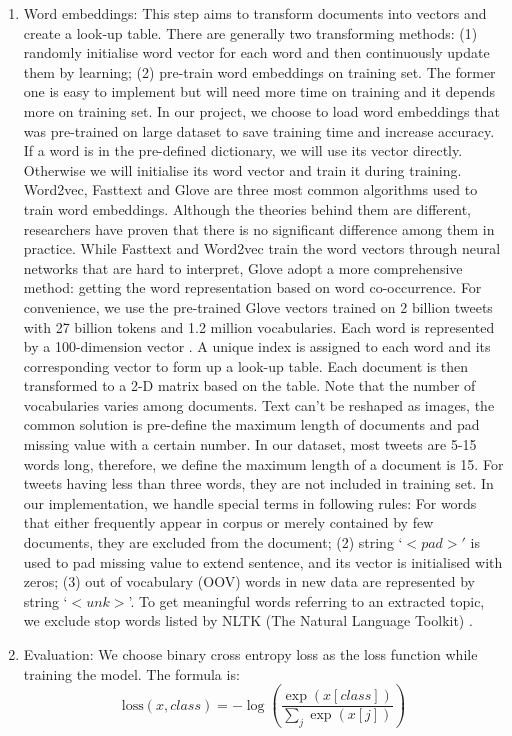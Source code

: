 \begin{enumerate}
    \item Word embeddings: This step aims to transform documents into vectors and create a look-up table. There are generally two transforming methods: (1) randomly initialise word vector for each word and then continuously update them by learning; (2) pre-train word embeddings on training set. The former one is easy to implement but will need more time on training and it depends more on training set. In our project, we choose to load word embeddings that was pre-trained on large dataset to save training time and increase accuracy. If a word is in the pre-defined dictionary, we will use its vector directly. Otherwise we will initialise its word vector and train it during training. Word2vec\cite{mikolov2013efficient}, Fasttext\cite{joulin2016bag} and Glove \cite{pennington2014glove} are three most common algorithms used to train word embeddings. Although the theories behind them are different, researchers have proven that there is no significant difference among them in practice. While Fasttext and Word2vec train the word vectors through neural networks that are hard to interpret, Glove adopt a more comprehensive method: getting the word representation based on word co-occurrence. For convenience, we use the pre-trained Glove vectors trained on 2 billion tweets with 27 billion tokens and 1.2 million vocabularies. Each word is represented by a 100-dimension vector \cite{pennington2014glove}. A unique index is assigned to each word and its corresponding vector to form up a look-up table. Each document is then transformed to a 2-D matrix based on the table. Note that the number of vocabularies varies among documents. Text can't be reshaped as images, the common solution is pre-define the maximum length of documents and pad missing value with a certain number. In our dataset, most tweets are 5-15 words long, therefore, we define the maximum length of a document is 15. For tweets having less than three words, they are not included in training set. In our implementation, we handle special terms in following rules: For words that either frequently appear in corpus or merely contained by few documents, they are excluded from the document; (2) string `$<pad>'$ is used to pad missing value to extend sentence, and its vector is initialised with zeros; (3) out of vocabulary (OOV) words in new data are represented by string `$<unk>$'. To get meaningful words referring to an extracted topic, we exclude stop words listed by NLTK (The Natural Language Toolkit) \cite{journals/corr/cs-CL-0205028}.
    \item Evaluation: We choose binary cross entropy loss as the loss function while training the model. The formula is: $$\text{loss}(x, class) = -\log\left(\frac{\exp(x[class])}{\sum_j \exp(x[j])}\right)
$$
\end{enumerate}
